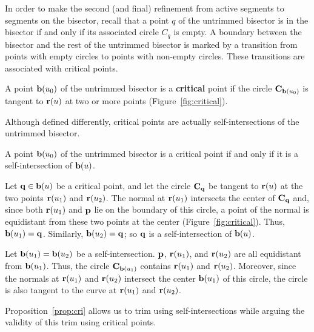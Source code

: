 In order to make the second (and final) refinement from active segments 
to segments on the bisector,
recall that a point $q$ of the untrimmed bisector is in the bisector
if and only if its associated circle $C_q$ is empty.
A boundary between the bisector and the rest of the untrimmed bisector
is marked by a transition from points with empty circles to points 
with non-empty circles.
These transitions are associated with critical points.

\begin{dfn}
\label{d:cri}
A point ${\bf b}(u_{0})$ of the untrimmed bisector is a {\bf critical} point 
if the circle ${\bf C}_{{\bf b}(u_0)}$
is tangent to ${\bf r}(u)$ at two or more points (Figure~\ref{fig:critical}).
\end{dfn}


Although defined differently, critical points are actually self-intersections
of the untrimmed bisector.

\begin{propn}
\label{prop:cri}
A point ${\bf b}(u_0)$ of the untrimmed bisector is a
critical point if and only if it is a self-intersection of ${\bf b}(u)$.
\end{propn}

\prf Let ${\bf q} \in {\bf b}(u)$ be a critical point, and let 
the circle ${\bf C}_{\bf q}$
be tangent to ${\bf r}(u)$ at the two points ${\bf r}(u_1)$ and ${\bf r}(u_2)$.
The normal at ${\bf r}(u_1)$ intersects the center of 
${\bf C}_{\bf q}$ and, since both ${\bf r}(u_1)$
and ${\bf p}$ lie on the boundary of this circle, a point of 
the normal is equidistant
from these two points at the center (Figure~\ref{fig:critical}).
Thus, ${\bf b}(u_{1}) = {\bf q}$.
Similarly, ${\bf b}(u_{2}) = {\bf q}$; so ${\bf q}$ is a self-intersection
of ${\bf b}(u)$.

Let ${\bf b}(u_{1}) = {\bf b}(u_{2})$ be a self-intersection.
${\bf p}$, ${\bf r}(u_{1})$, and ${\bf r}(u_{2})$ are all equidistant from 
${\bf b}(u_{1})$.
Thus, the circle ${\bf C}_{{\bf b}(u_{1})}$
contains ${\bf r}(u_{1})$ and ${\bf r}(u_{2})$.
Moreover, since the normals at ${\bf r}(u_{1})$ and ${\bf r}(u_{2})$
intersect the center ${\bf b}(u_{1})$ of this circle,
the circle is also tangent to the curve at 
${\bf r}(u_{1})$ and ${\bf r}(u_{2})$.
\QED

Proposition~\ref{prop:cri} allows us to trim using self-intersections
while arguing the validity of this trim using critical points.

